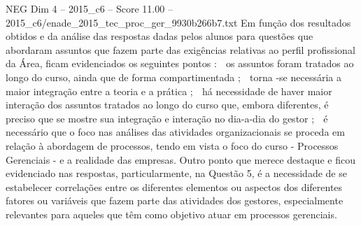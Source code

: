 \begin{textsample}{NEG Dim 4 – 2015\_c6 – Score 11.00 – 2015\_c6/enade\_2015\_tec\_proc\_ger\_9930b266b7.txt}
Em função dos resultados obtidos e da análise das respostas dadas pelos alunos para questões que abordaram assuntos que fazem parte das exigências relativas ao perfil profissional da Área, ficam evidenciados os seguintes pontos :  os assuntos foram tratados ao longo do curso, ainda que de forma compartimentada ;  torna -se necessária a maior integração entre a teoria e a prática ;  há necessidade de haver maior interação dos assuntos tratados ao longo do curso que, embora diferentes, é preciso que se mostre sua integração e interação no dia-a-dia do gestor ;  é necessário que o foco nas análises das atividades organizacionais se proceda em relação à abordagem de processos, tendo em vista o foco do curso - Processos Gerenciais - e a realidade das empresas.
Outro ponto que merece destaque e ficou evidenciado nas respostas, particularmente, na Questão 5, é a necessidade de se estabelecer correlações entre os diferentes elementos ou aspectos dos diferentes fatores ou variáveis que fazem parte das atividades dos gestores, especialmente relevantes para aqueles que têm como objetivo atuar em processos gerenciais.

\end{textsample}
